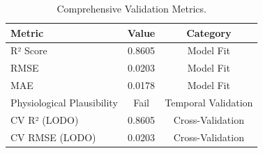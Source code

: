 \begin{table}
\caption{Comprehensive Validation Metrics.}
\label{tab:validation_summary}
\begin{tabular}{lcc}
\toprule
Metric & Value & Category \\
\midrule
R² Score & 0.8605 & Model Fit \\
RMSE & 0.0203 & Model Fit \\
MAE & 0.0178 & Model Fit \\
Physiological Plausibility & Fail & Temporal Validation \\
CV R² (LODO) & 0.8605 & Cross-Validation \\
CV RMSE (LODO) & 0.0203 & Cross-Validation \\
\bottomrule
\end{tabular}
\end{table}
